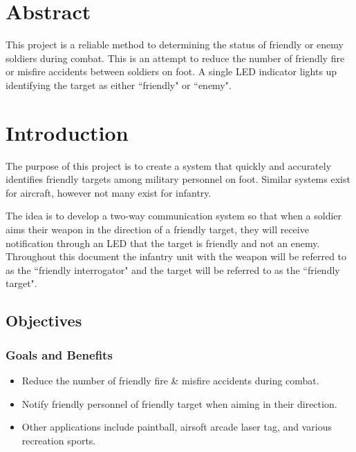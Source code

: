 \documentclass[letterpaper,10pt]{article}
\newcommand{\buildtoc}{
	\clearpage
	\singlespacing
	\tableofcontents
	\onehalfspacing
}
\begin{document}
\maketitle
\pagestyle{fancy}
\begin{spacing}{1.15}


\color{black}
\section*{Abstract}
This project is a reliable method to determining the status of friendly or enemy soldiers during combat. This is an attempt to reduce the number of friendly fire or misfire accidents between soldiers on foot. A single LED indicator lights up identifying the target as either ``friendly" or ``enemy".
\buildtoc
{}
\clearpage
\setcounter{page}{1}

\section{Introduction}
The purpose of this project is to create a system that quickly and accurately identifies friendly targets among military personnel on foot. Similar systems exist for aircraft, however not many exist for infantry.

The idea is to develop a two-way communication system so that when a soldier aims their weapon in the direction of a friendly target, they will receive notification through an LED that the target is friendly and not an enemy. Throughout this document the infantry unit with the weapon will be referred to as the ``friendly interrogator" and the target will  be referred to as the ``friendly target". 

\subsection{Objectives}
\subsubsection{Goals and Benefits}
\begin{itemize}
	\item Reduce the number of friendly fire \& misfire accidents during combat.
	\item Notify friendly personnel of friendly target when aiming in their direction.
	\item Other applications include paintball, airsoft arcade laser tag, and various recreation sports.
\end{itemize}



\end{spacing}
\end{document}
